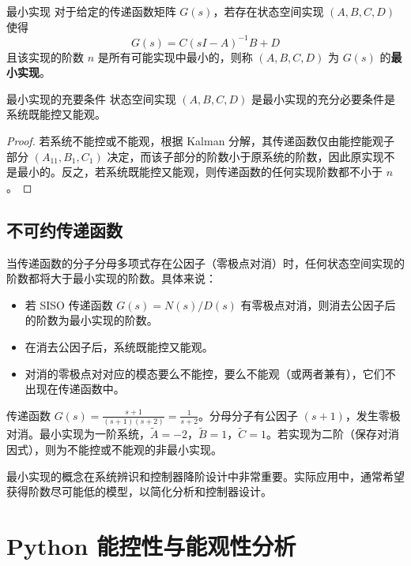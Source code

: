 \begin{mydefinition}{最小实现}
对于给定的传递函数矩阵 $G(s)$，若存在状态空间实现 $(A,B,C,D)$ 使得
\[
G(s) = C(sI - A)^{-1}B + D
\]
且该实现的阶数 $n$ 是所有可能实现中最小的，则称 $(A,B,C,D)$ 为 $G(s)$ 的\textbf{最小实现}。
\end{mydefinition}

\begin{myTheorem}{最小实现的充要条件}
状态空间实现 $(A,B,C,D)$ 是最小实现的充分必要条件是系统既能控又能观。
\end{myTheorem}

\begin{proof}
若系统不能控或不能观，根据 Kalman 分解，其传递函数仅由能控能观子部分 $(A_{11}, B_1, C_1)$ 决定，而该子部分的阶数小于原系统的阶数，因此原实现不是最小的。反之，若系统既能控又能观，则传递函数的任何实现阶数都不小于 $n$。
\end{proof}

\subsection{不可约传递函数}

当传递函数的分子分母多项式存在公因子（零极点对消）时，任何状态空间实现的阶数都将大于最小实现的阶数。具体来说：

\begin{itemize}
    \item 若 SISO 传递函数 $G(s) = N(s)/D(s)$ 有零极点对消，则消去公因子后的阶数为最小实现的阶数。
    \item 在消去公因子后，系统既能控又能观。
    \item 对消的零极点对对应的模态要么不能控，要么不能观（或两者兼有），它们不出现在传递函数中。
\end{itemize}

\begin{example}
传递函数 $G(s) = \frac{s+1}{(s+1)(s+2)} = \frac{1}{s+2}$。分母分子有公因子 $(s+1)$，发生零极对消。最小实现为一阶系统，$\tilde{A} = -2$，$\tilde{B} = 1$，$\tilde{C} = 1$。若实现为二阶（保存对消因式），则为不能控或不能观的非最小实现。
\end{example}

\begin{remark}
最小实现的概念在系统辨识和控制器降阶设计中非常重要。实际应用中，通常希望获得阶数尽可能低的模型，以简化分析和控制器设计。
\end{remark}

\section{Python 能控性与能观性分析}

